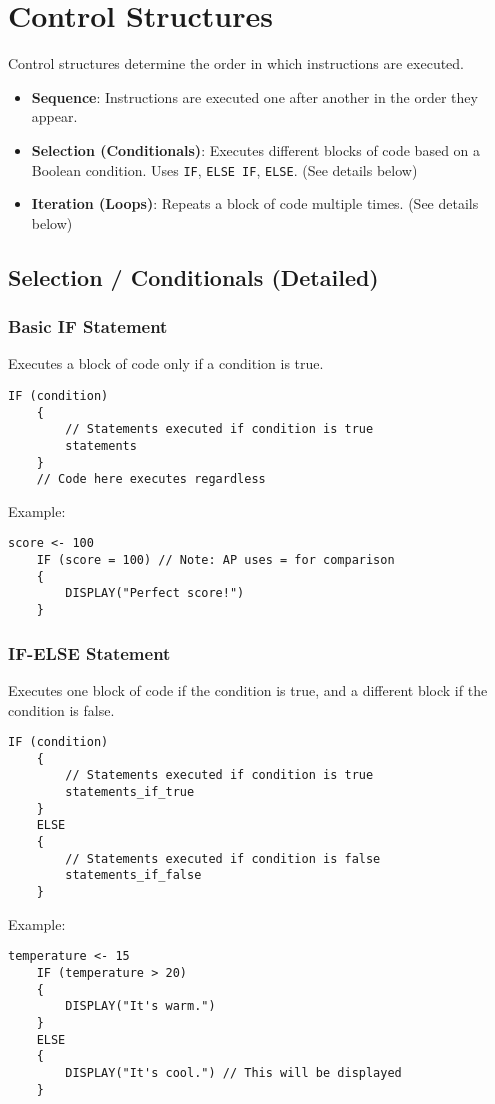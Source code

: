 \documentclass[11pt,oneside]{book}
\begin{document}
\section{Control Structures}
\label{sec:control_structures}
Control structures determine the order in which instructions are executed.
\begin{itemize}
    \item \textbf{Sequence}: Instructions are executed one after another in the order they appear.
    \item \textbf{Selection (Conditionals)}: Executes different blocks of code based on a Boolean condition. Uses \texttt{IF}, \texttt{ELSE IF}, \texttt{ELSE}. (See details below)
    \item \textbf{Iteration (Loops)}: Repeats a block of code multiple times. (See details below)
\end{itemize}

\subsection*{Selection / Conditionals (Detailed)}

\subsubsection*{Basic IF Statement}
Executes a block of code only if a condition is true.
\begin{lstlisting}[language={}, label={lst:basic_if}, caption={AP Pseudocode: Basic IF}]
    IF (condition)
    {
        // Statements executed if condition is true
        statements
    }
    // Code here executes regardless
\end{lstlisting}
Example:
\begin{lstlisting}[language={}]
    score <- 100
    IF (score = 100) // Note: AP uses = for comparison
    {
        DISPLAY("Perfect score!")
    }
\end{lstlisting}

\subsubsection*{IF-ELSE Statement}
Executes one block of code if the condition is true, and a different block if the condition is false.
\begin{lstlisting}[language={}, label={lst:if_else}, caption={AP Pseudocode: IF-ELSE}]
    IF (condition)
    {
        // Statements executed if condition is true
        statements_if_true
    }
    ELSE
    {
        // Statements executed if condition is false
        statements_if_false
    }
\end{lstlisting}
Example:
\begin{lstlisting}[language={}]
    temperature <- 15
    IF (temperature > 20)
    {
        DISPLAY("It's warm.")
    }
    ELSE
    {
        DISPLAY("It's cool.") // This will be displayed
    }
\end{lstlisting}
\end{document}
